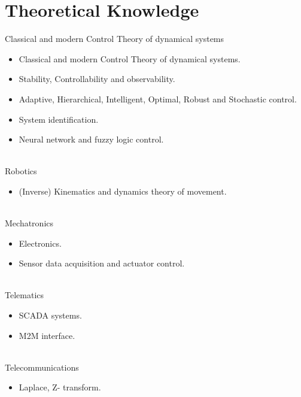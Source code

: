 \documentclass[letterpaper]{engineer_cv} %
\begin{document}

	\section{Theoretical Knowledge}

	\begin{longList} %
		\longListItem
			{}
			{}
			{Classical and modern Control Theory of dynamical systems}
			{}
			{}
			{\begin{itemize}
				\item Classical and modern Control Theory of dynamical systems.
				\item Stability, Controllability and observability.
				\item Adaptive, Hierarchical, Intelligent, Optimal, Robust and Stochastic control.
				\item System identification.
				\item Neural network and fuzzy logic control.
			\end{itemize}}
			\\
		\longListItem
			{}
			{}
			{Robotics}
			{}
			{}
			{\begin{itemize}
				\item (Inverse) Kinematics and dynamics theory of movement.
			\end{itemize}}
			\\
		\longListItem
			{}
			{}
			{Mechatronics}
			{}
			{}
			{\begin{itemize}
				\item Electronics.
				\item Sensor data acquisition and actuator control.
			\end{itemize}}
			\\
		\longListItem
			{}
			{}
			{Telematics}
			{}
			{}
			{\begin{itemize}
				\item SCADA systems.
				\item M2M interface.
			\end{itemize}}
			\\
		\longListItem
			{}
			{}
			{Telecommunications}
			{}
			{}
			{\begin{itemize}
				\item Laplace, Z- transform.
			\end{itemize}}
			\\
	\end{longList}
\end{document}
